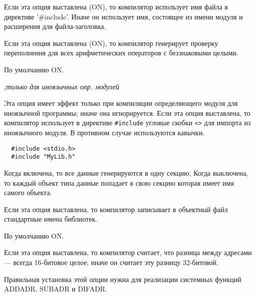 \begin{description}
\ifgenc
{}
        \MLBegin{}\ModeC{}\MLEnd{}

Если эта опция выставлена (ON), то компилятор использует
имя файла в директиве '\#include'. Иначе он использует имя, состоящее
из имени модуля и расширения для файла-заголовка.
\fi

\ifgenc\else
{}
        \MLBegin{}\ModeC{}\MLEnd{} \inline

Если эта опция выставлена (ON), то компилятор генерирует проверку 
переполнения для всех арифметических операторов с беззнаковыми целыми.

По умолчанию ON.
\fi

\ifgenc
{}
        \MLBegin{}\ModeC{},{\em только для иноязычных опр. модулей}\MLEnd{} \header

Эта опция имеет эффект только при компиляции определяющего модуля
для иноязычной программы; иначе она игнорируется.
Если эта опция выставлена, то компилятор использует в директиве 
\verb|#include| угловые скобки \verb+<>+ для импорта из
иноязычного модуля. В противном случае используются кавычки.
\begin{verbatim}
  #include <stdio.h>
  #include "MyLib.h"
\end{verbatim}
\fi

\ifgenvax
{}
        \MLBegin{}\ModeC{}\MLEnd{}
Когда включена, то все данные генерируются в одну секцию,
Когда выключена, то каждый объект типа данные попадает в свою секцию
которая имеет имя самого объекта.
\fi

\ifgencode
{}
        \MLBegin{}\ModeC{}\MLEnd{}

Если эта опция выставлена, то компилятор 
записывает в объектный файл стандартные имена библиотек.

По умолчанию ON.
\fi

\ifgenc
{}
        \MLBegin{}\ModeC{}\MLEnd{}

Если эта опция выставлена, то компилятор считает, что
разница между адресами --- всегда 16-битовое целое;
иначе он считает эту разницу 32-битовой.

Правильная установка этой опции нужна для реализации 
системных функций ADDADR, SUBADR и DIFADR.


\end{description}
